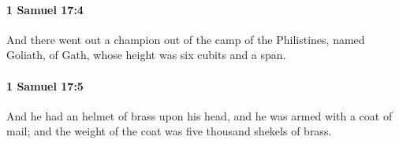 		\paragraph{1 Samuel 17:4} %
			\label{1SAMUEL-17-4}

			And there went out a champion out of the camp of the Philistines, named Goliath, of Gath, whose height was six cubits and a span.


		\paragraph{1 Samuel 17:5} %
			\label{1SAMUEL-17-5}

			And he had an helmet of brass upon his head, and he was armed with a coat of mail; and the weight of the coat was five thousand shekels of brass.


